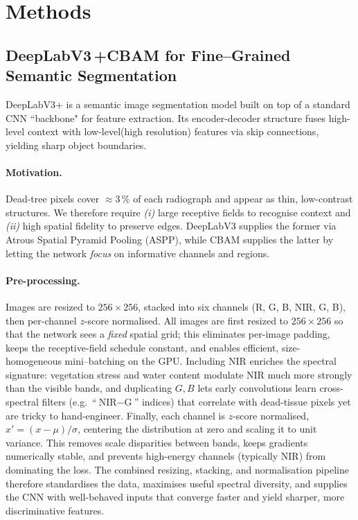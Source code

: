 \section{Methods}
\subsection{DeepLabV3\,+CBAM for Fine–Grained Semantic Segmentation}
\label{sec:seg_deeplab_cbam}
DeepLabV3+ is a semantic image segmentation model built on top of a standard CNN ``backbone" for feature extraction. Its encoder-decoder structure fuses high-level context with low-level(high resolution) features via skip connections, yielding sharp object boundaries. 
\paragraph{Motivation.}
Dead-tree pixels cover $\approx$3\,\% of each radiograph and appear as thin,
low-contrast structures.  
We therefore require \emph{(i)} large receptive fields to recognise context
and \emph{(ii)} high spatial fidelity to preserve edges.  
DeepLabV3 supplies the former via
Atrous Spatial Pyramid Pooling (ASPP), while
CBAM supplies the latter by letting the network
\textit{focus} on informative channels and regions.

\paragraph{Pre-processing.}
Images are resized to \(256\times256\), stacked into six channels
(R, G, B, NIR, G, B), then per-channel $z$-score normalised.
All images are first resized to \(256 \times 256\) so that the network sees a
\emph{fixed} spatial grid; this eliminates per-image padding, keeps the
receptive-field schedule constant, and enables efficient, size-homogeneous
mini–batching on the GPU.
Including NIR enriches the spectral signature: vegetation stress and
water content modulate NIR much more strongly than the visible bands, and
duplicating \(G,B\) lets early convolutions learn cross-spectral filters
(e.g.\ “\(\text{NIR}-\text{G}\)” indices) that correlate with
dead-tissue pixels yet are tricky to hand-engineer.
Finally, each channel is $z$-score normalised,
\(x' = (x - \mu) / \sigma\),
centering the distribution at zero and scaling it to unit variance.
This removes scale disparities between bands, keeps gradients numerically
stable, and prevents high-energy channels (typically NIR) from dominating the
loss.  The combined resizing, stacking, and normalisation pipeline therefore
standardises the data, maximises useful spectral diversity, and supplies the
CNN with well-behaved inputs that converge faster and yield sharper,
more discriminative features.

